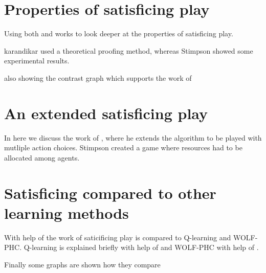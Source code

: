 \section{Properties of satisficing play}
\drafting

Using both \citep{karandikar} and \citep{stimpson:2001} works to look deeper
at the properties of satisficing play. 

karandikar used a theoretical proofing method, whereas Stimpson showed some
experimental results.

also showing the contrast graph which supports the work of \citep{arthur}

\section{An extended satisficing play}
\drafting

In here we discuss the work of \citep{stimpson:2003}, where he extends the
algorithm to be played with mutliple action choices.
Stimpson created a game where resources had to be allocated among agents.

\section{Satisficing compared to other learning methods}
\drafting

With help of the work of \citep{crandall} saticificing play is compared
to Q-learning and WOLF-PHC.
Q-learning is explained briefly with help of \citep{sandholm} and WOLF-PHC
with help of \citep{bowling}.
 
Finally some graphs are shown how they compare



\address{Jappie Klooster\\
  Dept. of Informatics\\
  Universiteit Utrecht\\
  The Netherlands\\}
